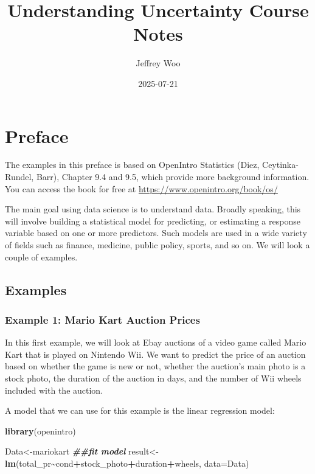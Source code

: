 \documentclass[
]{book}
\title{Understanding Uncertainty Course Notes}
\author{Jeffrey Woo}
\date{2025-07-21}
\newenvironment{Shaded}{\begin{snugshade}}{\end{snugshade}}
\newcommand{\AttributeTok}[1]{\textcolor[rgb]{0.13,0.29,0.53}{#1}}
\newcommand{\DocumentationTok}[1]{\textcolor[rgb]{0.56,0.35,0.01}{\textbf{\textit{#1}}}}
\newcommand{\FunctionTok}[1]{\textcolor[rgb]{0.13,0.29,0.53}{\textbf{#1}}}
\newcommand{\NormalTok}[1]{#1}
\newcommand{\OtherTok}[1]{\textcolor[rgb]{0.56,0.35,0.01}{#1}}
\newcommand{\SpecialCharTok}[1]{\textcolor[rgb]{0.81,0.36,0.00}{\textbf{#1}}}
\begin{document}
\maketitle

{
\setcounter{tocdepth}{1}
\tableofcontents
}
\chapter*{Preface}\label{preface}

The examples in this preface is based on OpenIntro Statistics (Diez, Ceytinka-Rundel, Barr), Chapter 9.4 and 9.5, which provide more background information. You can access the book for free at \url{https://www.openintro.org/book/os/}

The main goal using data science is to understand data. Broadly speaking, this will involve building a statistical model for predicting, or estimating a response variable based on one or more predictors. Such models are used in a wide variety of fields such as finance, medicine, public policy, sports, and so on. We will look a couple of examples.

\section{Examples}\label{examples}

\subsection{Example 1: Mario Kart Auction Prices}\label{example-1-mario-kart-auction-prices}

In this first example, we will look at Ebay auctions of a video game called Mario Kart that is played on Nintendo Wii. We want to predict the price of an auction based on whether the game is new or not, whether the auction's main photo is a stock photo, the duration of the auction in days, and the number of Wii wheels included with the auction.

A model that we can use for this example is the linear regression model:

\begin{Shaded}
\begin{Highlighting}[]
\FunctionTok{library}\NormalTok{(openintro)}

\NormalTok{Data}\OtherTok{\textless{}{-}}\NormalTok{mariokart}
\DocumentationTok{\#\#fit model}
\NormalTok{result}\OtherTok{\textless{}{-}}\FunctionTok{lm}\NormalTok{(total\_pr}\SpecialCharTok{\textasciitilde{}}\NormalTok{cond}\SpecialCharTok{+}\NormalTok{stock\_photo}\SpecialCharTok{+}\NormalTok{duration}\SpecialCharTok{+}\NormalTok{wheels, }\AttributeTok{data=}\NormalTok{Data)}
\end{Highlighting}
\end{Shaded}
\end{document}
